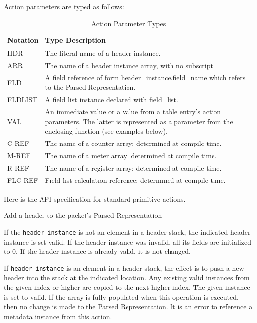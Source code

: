\documentclass[12pt]{article}
\begin{document}
Action parameters are typed as follows:

\begin{table}[H]
\begin{center}
\begin{tabular}{| l | p{} |} \hline
\textbf{Notation} &
\textbf{Type Description} \\ \hline
HDR &
The literal name of a header instance. \\ \hline
ARR &
The name of a header instance array, with no subscript. \\ \hline
FLD &
A field reference of form header_instance.field_name which refers to the Parsed Representation. \\ \hline
FLDLIST &
A field list instance declared with field_list. \\ \hline
VAL &
An immediate value or a value from a table entry's action parameters. The latter is represented as a parameter from the enclosing function (see examples below). \\ \hline
C-REF &
The name of a counter array; determined at compile time. \\ \hline
M-REF &
The name of a meter array; determined at compile time. \\ \hline
R-REF &
The name of a register array; determined at compile time. \\ \hline
FLC-REF &
Field list calculation reference; determined at compile time. \\ \hline
\end{tabular}
\end{center}
\caption{Action Parameter Types}
\label{tab:actionparamtypes}
\end{table}


Here is the API specification for standard primitive actions.


{ %
Add a header to the packet's Parsed Representation
}
{ %
}
{ %
If the \texttt{header_instance} is not an element in a header stack, the indicated
header instance is set valid. If the header instance was invalid, all its
fields are initialized to 0. If the header instance is already valid, it is
not changed.

If \texttt{header_instance} is an element in a header stack, the effect is to push
a new header into the stack at the indicated location. Any existing valid
instances from the given index or higher are copied to the next higher index.
The given instance is set to valid. If the array is fully populated when this
operation is executed, then no change is made to the Parsed Representation.
It is an error to reference a metadata instance from this action.
}
\end{document}
